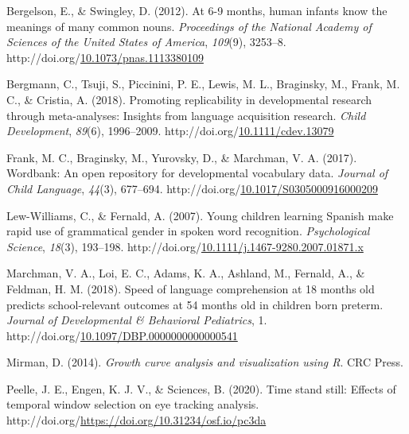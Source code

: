 \documentclass[10pt, letterpaper]{article}
\newenvironment{CSLReferences}%
  {}%
  {\par}
\begin{document}
\setlength{\parindent}{-0.1in} 
\setlength{\leftskip}{0.125in}

\noindent

\hypertarget{refs}{}
\begin{CSLReferences}{1}{0}
\leavevmode\hypertarget{ref-Bergelson2012a}{}%
Bergelson, E., \& Swingley, D. (2012). {At 6-9 months, human infants
know the meanings of many common nouns.} \emph{Proceedings of the
National Academy of Sciences of the United States of America},
\emph{109}(9), 3253--8.
http://doi.org/\href{https://doi.org/10.1073/pnas.1113380109}{10.1073/pnas.1113380109}

\leavevmode\hypertarget{ref-Bergmann2018}{}%
Bergmann, C., Tsuji, S., Piccinini, P. E., Lewis, M. L., Braginsky, M.,
Frank, M. C., \& Cristia, A. (2018). {Promoting replicability in
developmental research through meta-analyses: Insights from language
acquisition research}. \emph{Child Development}, \emph{89}(6),
1996--2009.
http://doi.org/\href{https://doi.org/10.1111/cdev.13079}{10.1111/cdev.13079}

\leavevmode\hypertarget{ref-Frank2016}{}%
Frank, M. C., Braginsky, M., Yurovsky, D., \& Marchman, V. A. (2017).
{Wordbank: An open repository for developmental vocabulary data}.
\emph{Journal of Child Language}, \emph{44}(3), 677--694.
http://doi.org/\href{https://doi.org/10.1017/S0305000916000209}{10.1017/S0305000916000209}

\leavevmode\hypertarget{ref-Lew-Williams2007}{}%
Lew-Williams, C., \& Fernald, A. (2007). {Young children learning
Spanish make rapid use of grammatical gender in spoken word
recognition}. \emph{Psychological Science}, \emph{18}(3), 193--198.
http://doi.org/\href{https://doi.org/10.1111/j.1467-9280.2007.01871.x}{10.1111/j.1467-9280.2007.01871.x}

\leavevmode\hypertarget{ref-Marchman2018}{}%
Marchman, V. A., Loi, E. C., Adams, K. A., Ashland, M., Fernald, A., \&
Feldman, H. M. (2018). {Speed of language comprehension at 18 months old
predicts school-relevant outcomes at 54 months old in children born
preterm}. \emph{Journal of Developmental {\&} Behavioral Pediatrics}, 1.
http://doi.org/\href{https://doi.org/10.1097/DBP.0000000000000541}{10.1097/DBP.0000000000000541}

\leavevmode\hypertarget{ref-Mirman2014}{}%
Mirman, D. (2014). \emph{{Growth curve analysis and visualization using
R}}. CRC Press.

\leavevmode\hypertarget{ref-Peelle2020}{}%
Peelle, J. E., Engen, K. J. V., \& Sciences, B. (2020). {Time stand
still: Effects of temporal window selection on eye tracking analysis}.
http://doi.org/\url{https://doi.org/10.31234/osf.io/pc3da}


\end{CSLReferences}
\end{document}
